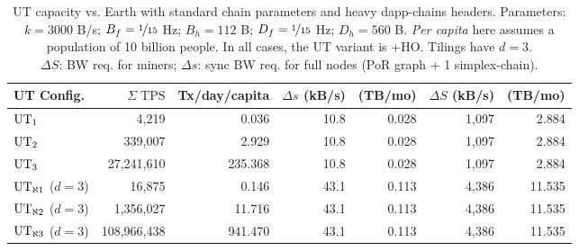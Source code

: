 \begin{table}[h]%
    \vspace{0.5em}
    \centering
    \caption[UT capacity vs. Earth with standard chain parameters and heavy dapp-chains headers.]{
        UT capacity vs. Earth with standard chain parameters and heavy dapp-chains headers. %
        Parameters: $k = 3000$ B/s; $B_f = \nicefrac{1}{15}$ Hz; $B_h = 112$ B; $D_f = \nicefrac{1}{15}$ Hz; $D_h = 560$ B. %
        \emph{Per capita} here assumes a population of 10 billion people. %
        In all cases, the UT variant is +HO.
        Tilings have $d = 3$. \\
        $\Delta S$: BW req. for miners; $\Delta s$: sync BW req. for full nodes (PoR graph + 1 simplex-chain).
    }
    \begin{tabular}{lrrrrrr}
        \toprule
        UT Config. & $\Sigma\;\text{TPS}$ & Tx/day/capita & $\Delta s$ (kB/s) & \hspace{-0.75em}(TB/mo) & $\Delta S$ (kB/s) & \hspace{-0.75em}(TB/mo) \\
        \midrule
        $\text{UT}_{1}$            & 4,219 & 0.036 & 10.8 & 0.028 & 1,097 & 2.884 \\
        $\text{UT}_{2}$            & 339,007 & 2.929 & 10.8 & 0.028 & 1,097 & 2.884 \\
        $\text{UT}_{3}$            & 27,241,610 & 235.368 & 10.8 & 0.028 & 1,097 & 2.884 \\
        $\UTinf{1}$ ($d=3$) & 16,875 & 0.146 & 43.1 & 0.113 & 4,386 & 11.535 \\
        $\UTinf{2}$ ($d=3$) & 1,356,027 & 11.716 & 43.1 & 0.113 & 4,386 & 11.535 \\
        $\UTinf{3}$ ($d=3$) & 108,966,438 & 941.470 & 43.1 & 0.113 & 4,386 & 11.535 \\
        \bottomrule
    \end{tabular}
    \label{table:ut-vs-earth}
\end{table}


